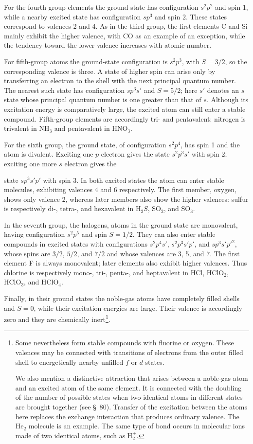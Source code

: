 For the fourth-group elements the ground state has configuration $s^2p^2$ and spin 1, while a nearby excited state has configuration $sp^3$ and spin 2. These states correspond to valences 2 and 4. As in the third group, the first elements C and Si mainly exhibit the higher valence, with CO as an example of an exception, while the tendency toward the lower valence increases with atomic number.

For fifth-group atoms the ground-state configuration is $s^2p^3$, with $S=3/2$, so the corresponding valence is three. A state of higher spin can arise only by transferring an electron to the shell with the next principal quantum number. The nearest such state has configuration $sp^3s'$ and $S=5/2$; here $s'$ denotes an $s$ state whose principal quantum number is one greater than that of $s$. Although its excitation energy is comparatively large, the excited atom can still enter a stable compound. Fifth-group elements are accordingly tri- and pentavalent: nitrogen is trivalent in $\mathrm{NH}_3$ and pentavalent in $\mathrm{HNO}_3$.

For the sixth group, the ground state, of configuration $s^2p^4$, has spin 1 and the atom is divalent. Exciting one $p$ electron gives the state $s^2p^3s'$ with spin 2; exciting one more $s$ electron gives the

state $sp^3s'p'$ with spin 3. In both excited states the atom can enter stable molecules, exhibiting valences 4 and 6 respectively. The first member, oxygen, shows only valence 2, whereas later members also show the higher valences: sulfur is respectively di-, tetra-, and hexavalent in $\mathrm H_2S$, $\mathrm{SO}_2$, and $\mathrm{SO}_3$.

In the seventh group, the halogens, atoms in the ground state are monovalent, having configuration $s^2p^5$ and spin $S=1/2$. They can also enter stable compounds in excited states with configurations $s^2p^4s'$, $s^2p^3s'p'$, and $sp^3s'p'^2$, whose spins are $3/2$, $5/2$, and $7/2$ and whose valences are 3, 5, and 7. The first element F is always monovalent; later elements also exhibit higher valences. Thus chlorine is respectively mono-, tri-, penta-, and heptavalent in HCl, $\mathrm{HClO}_2$, $\mathrm{HClO}_3$, and $\mathrm{HClO}_4$.

Finally, in their ground states the noble-gas atoms have completely filled shells and $S=0$, while their excitation energies are large. Their valence is accordingly zero and they are chemically inert\footnote{Some nevertheless form stable compounds with fluorine or oxygen. These valences may be connected with transitions of electrons from the outer filled shell to energetically nearby unfilled $f$ or $d$ states.

We also mention a distinctive attraction that arises between a noble-gas atom and an excited atom of the same element. It is connected with the doubling of the number of possible states when two identical atoms in different states are brought together (see \S~80). Transfer of the excitation between the atoms here replaces the exchange interaction that produces ordinary valence. The $\mathrm{He}_2$ molecule is an example. The same type of bond occurs in molecular ions made of two identical atoms, such as $\mathrm H_2^+$.}.

